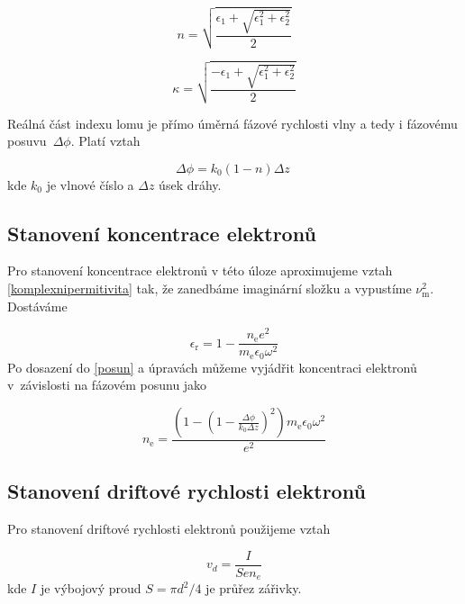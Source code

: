 \documentclass[a4paper,12pt]{article}
\begin{document}
\begin{equation}
	n = \sqrt{\frac{\epsilon_1 + \sqrt{\epsilon_1^2 + \epsilon_2^2}}{2}}
	\label{realna}
\end{equation}

\begin{equation}
	\kappa = \sqrt{\frac{-\epsilon_1 + \sqrt{\epsilon_1^2 + \epsilon_2^2}}{2}}
	\label{imaginarni}
\end{equation}

Reálná část indexu lomu je
přímo úměrná fázové rychlosti vlny a tedy i fázovému posuvu~$\Delta\phi$. Platí vztah

\begin{equation}
 	\Delta\phi = k_0(1-n) \Delta
z~\label{posun}
\end{equation}
kde $k_0$ je vlnové číslo a $\Delta z$ úsek dráhy.  

\subsection{Stanovení koncentrace elektronů}
Pro stanovení koncentrace elektronů v této úloze aproximujeme vztah 
\eqref{komplexnipermitivita} tak, že zanedbáme imaginární složku a vypustíme 
$\nu_\text{m}^2$. Dostáváme

\begin{equation}
	\epsilon_\text{r} = 1- \frac{n_\text{e} e^2}{m_\text{e} \epsilon_0 \omega^2}
	\label{permitivita}
\end{equation}
Po dosazení do \eqref{posun} a úpravách můžeme vyjádřit koncentraci elektronů
v~závislosti na fázovém posunu jako

\begin{equation}
	n_\text{e} = \frac{\left(1-\left(1-\frac{\Delta\phi}{k_0 \Delta z} 
	\right)^2\right)
	m_\text{e} \epsilon_0 \omega^2}{e^2}
\label{eq:koncentrace}
\end{equation}

\subsection{Stanovení driftové rychlosti elektronů}
Pro stanovení driftové rychlosti elektronů použijeme vztah

\begin{equation}
	v_d = \frac{I}{S e n_e}
	\label{eq:vd}
\end{equation}
kde $I$ je výbojový proud $S = \pi d^2/4$ je průřez zářivky.
\end{document}
